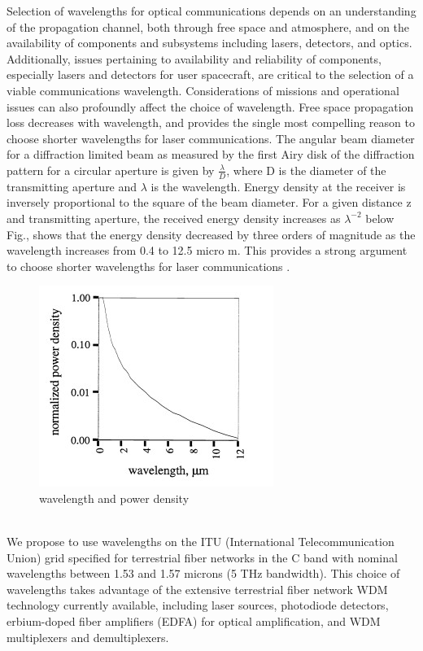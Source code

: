 Selection of wavelengths for optical communications depends on an understanding of the propagation channel, both through free space and atmosphere, and on the availability of components and subsystems including lasers, detectors, and optics. Additionally, issues pertaining to availability and reliability of components, especially lasers and detectors for user spacecraft, are critical to the selection of a viable communications wavelength. Considerations of missions and operational issues can also profoundly affect the choice of wavelength. Free space propagation loss decreases with wavelength, and provides the single most compelling reason to choose shorter wavelengths for laser communications. The angular beam diameter for a diffraction limited beam as measured by the first Airy disk of the diffraction pattern for a circular aperture is given by $\tfrac{\lambda}{D}$, where D is the diameter of the transmitting aperture and $\lambda$ is the wavelength. Energy density at the receiver is inversely proportional to the square of the beam diameter. For a given distance z and transmitting aperture, the received energy density increases as $\lambda^{-2}$ below Fig., shows that the energy density decreased by three orders of magnitude as the wavelength increases from 0.4 to 12.5 micro m. This provides a strong argument to choose shorter wavelengths for laser communications \cite{article:wavelength}.
\begin{figure}[htb]
\begin{center}
\includegraphics[width=0.7\columnwidth]{figures/laser-communication/bh4.jpg}
\caption{wavelength and power density}
\end{center}
\end{figure}
\\
We propose to use wavelengths on the ITU (International Telecommunication Union) grid specified for terrestrial fiber networks in the C band with nominal wavelengths between 1.53 and 1.57 microns (5 THz bandwidth). This choice of wavelengths takes advantage of the extensive terrestrial fiber network WDM technology currently available, including laser sources, photodiode detectors, erbium-doped fiber amplifiers (EDFA) for optical amplification, and WDM multiplexers and demultiplexers. 
